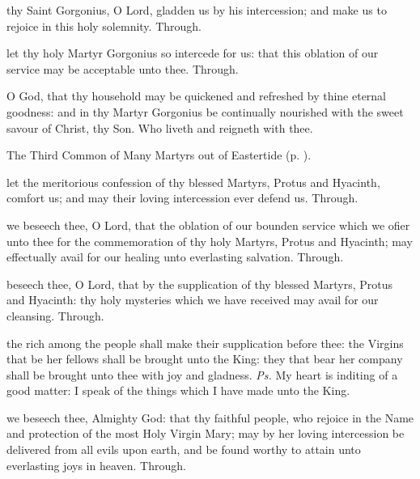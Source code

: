 \collect
{} thy Saint Gorgonius, O Lord, gladden us by his intercession; and make us to rejoice in this holy solemnity. Through.


\secret
{} let thy holy Martyr Gorgonius so intercede for us: that this oblation of our service may be acceptable unto thee. Through.


\postcommunion
{} O God, that thy household may be quickened and refreshed by thine eternal goodness: and in thy Martyr Gorgonius be continually nourished with the sweet savour of Christ, thy Son. Who liveth and reigneth with thee.


\clearpage
{}

\begin{rubric}
	The Third Common of Many Martyrs out of Eastertide (p. \pageref{CommonMartyrsIII}).
\end{rubric}

\collect
{} let the meritorious confession of thy blessed Martyrs, Protus and Hyacinth, comfort us; and may their loving intercession ever defend us. Through.

\secret
{} we beseech thee, O Lord, that the oblation of our bounden service which we ofier unto thee for the commemoration of thy holy Martyrs, Protus and Hyacinth; may effectually avail for our healing unto everlasting salvation. Through.

\postcommunion
{} beseech thee, O Lord, that by the supplication of thy blessed Martyrs, Protus and Hyacinth: thy holy mysteries which we have received may avail for our cleansing. Through.



\introit
{} the rich among the people shall make their supplication before thee: the Virgins that be her fellows shall be brought unto the King: they that bear her company shall be brought unto thee with joy and gladness. \textit{Ps.} My heart is inditing of a good matter: I speak of the things which I have made unto the King.

\collect
{} we beseech thee, Almighty God: that thy faithful people, who rejoice in the Name and protection of the most Holy Virgin Mary; may by her loving intercession be delivered from all evils upon earth, and be found worthy to attain unto everlasting joys in heaven. Through.

